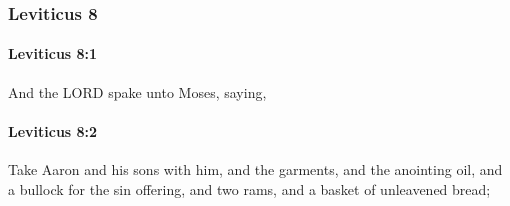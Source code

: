 	\subsubsection{Leviticus 8} %
		\label{LEVITICUS-8}

		\paragraph{Leviticus 8:1} %
			\label{LEVITICUS-8-1}

			And the LORD spake unto Moses, saying,


		\paragraph{Leviticus 8:2} %
			\label{LEVITICUS-8-2}

			Take Aaron and his sons with him, and the garments, and the anointing oil, and a bullock for the sin offering, and two rams, and a basket of unleavened bread;

